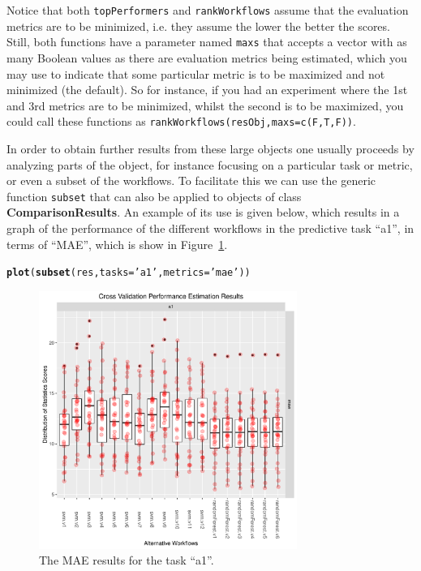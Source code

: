 \documentclass[10pt,a4paper]{article}\usepackage[]{graphicx}\usepackage[]{color}
\makeatletter
\newcommand{\hlstr}[1]{\textcolor[rgb]{0.192,0.494,0.8}{#1}}%
\newcommand{\hlstd}[1]{\textcolor[rgb]{0.345,0.345,0.345}{#1}}%
\newcommand{\hlkwc}[1]{\textcolor[rgb]{0.333,0.667,0.333}{#1}}%
\newcommand{\hlkwd}[1]{\textcolor[rgb]{0.737,0.353,0.396}{\textbf{#1}}}%
\newenvironment{kframe}{%
 \def\at@end@of@kframe{}%
 \ifinner\ifhmode%
  \def\at@end@of@kframe{\end{minipage}}%
  \begin{minipage}{\columnwidth}%
 \fi\fi%
 \def\FrameCommand##1{\hskip\@totalleftmargin \hskip-\fboxsep
 \colorbox{shadecolor}{##1}\hskip-\fboxsep
     \hskip-\linewidth \hskip-\@totalleftmargin \hskip\columnwidth}%
 \MakeFramed {\advance\hsize-\width
   \@totalleftmargin\z@ \linewidth\hsize
   \@setminipage}}%
 {\par\unskip\endMakeFramed%
 \at@end@of@kframe}
\newenvironment{knitrout}{}{} %
\makeatother
\begin{document}
Notice that both \texttt{topPerformers} and \texttt{rankWorkflows}
assume that the evaluation metrics are to be minimized, i.e. they
assume the lower the better the scores. Still, both functions have a
parameter named \texttt{maxs} that accepts a vector with as many
Boolean values as there are evaluation metrics being estimated, which
you may use to indicate that some particular metric is to be maximized
and not minimized (the default). So for instance, if you had an
experiment where the 1st and 3rd metrics are to be minimized, whilst
the second is to be maximized, you could call these functions as
\texttt{rankWorkflows(resObj,maxs=c(F,T,F))}.

In order to obtain further results from these large objects one
usually proceeds by analyzing parts of the object, for instance
focusing on a particular task or metric, or even a subset of the
workflows. To facilitate this we can use the generic function
\texttt{subset} that can also be applied to objects of class
\textbf{ComparisonResults}. An example of its use is given below, which results
in a graph of the performance of the different workflows in the
predictive task ``a1'', in terms of ``MAE'', which is show in
Figure~\ref{fig:maeA1}.



\begin{knitrout}\footnotesize
{}\color{fgcolor}\begin{kframe}
\begin{alltt}
\hlkwd{plot}\hlstd{(}\hlkwd{subset}\hlstd{(res,} \hlkwc{tasks}\hlstd{=}\hlstr{'a1'}\hlstd{,} \hlkwc{metrics}\hlstd{=}\hlstr{'mae'}\hlstd{))}
\end{alltt}
\end{kframe}\begin{figure}

{\centering \includegraphics[width=0.75\textwidth]{figures/perfEst-maeA1-1} 

}

\caption[The MAE results for the task ``a1'']{The MAE results for the task ``a1''.}\label{fig:maeA1}
\end{figure}


\end{knitrout}
 
\end{document}
